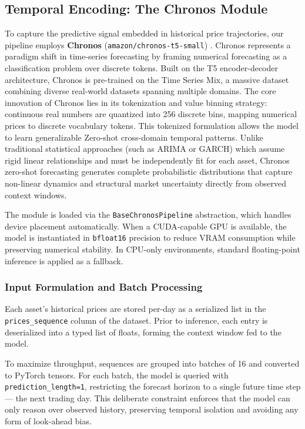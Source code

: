     \subsection{Temporal Encoding: The Chronos Module}\label{sec:chronos}
    To capture the predictive signal embedded in historical price trajectories, our pipeline employs \textbf{Chronos} (\texttt{amazon/chronos-t5-small}) \cite{ansari2024chronos}. Chronos represents a paradigm shift in time-series forecasting by framing numerical forecasting as a classification problem over discrete tokens. Built on the T5 encoder-decoder architecture, Chronos is pre-trained on the Time Series Mix, a massive dataset combining diverse real-world datasets spanning multiple domains. The core innovation of Chronos lies in its tokenization and value binning strategy: continuous real numbers are quantized into 256 discrete bins, mapping numerical prices to discrete vocabulary tokens. This tokenized formulation allows the model to learn generalizable Zero-shot cross-domain temporal patterns. Unlike traditional statistical approaches (such as ARIMA or GARCH) which assume rigid linear relationships and must be independently fit for each asset, Chronos zero-shot forecasting generates complete probabilistic distributions that capture non-linear dynamics and structural market uncertainty directly from observed context windows.

    The module is loaded via the \texttt{BaseChronosPipeline} abstraction, which handles device placement automatically. When a CUDA-capable GPU is available, the model is instantiated in \texttt{bfloat16} precision to reduce VRAM consumption while preserving numerical stability. In CPU-only environments, standard floating-point inference is applied as a fallback.

    \subsubsection{Input Formulation and Batch Processing}
    Each asset's historical prices are stored per-day as a serialized list in the \texttt{prices\_sequence} column of the dataset. Prior to inference, each entry is deserialized into a typed list of floats, forming the context window fed to the model.

    To maximize throughput, sequences are grouped into batches of 16 and converted to PyTorch tensors. For each batch, the model is queried with \texttt{prediction\_length=1}, restricting the forecast horizon to a single future time step — the next trading day. This deliberate constraint enforces that the model can only reason over observed history, preserving temporal isolation and avoiding any form of look-ahead bias.

